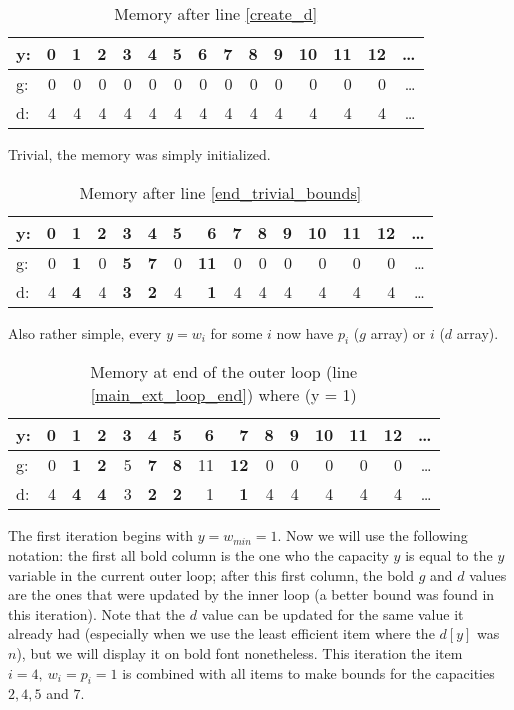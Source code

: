 \documentclass[12pt]{article}
\begin{document}
\begin{table}[h]
\centering
\caption{Memory after line \ref{create_d}}
\label{mem_after_creation}
\begin{tabular}{l|rrrrrrrrrrrrrr}
y: & 0 &1 &2 &3 &4 &5 &6 &7 &8 &9 &10 &11 &12 &\dots\\
\hline
g: & 0 &0 &0 &0 &0 &0 &0 &0 &0 &0 &0 &0 &0 &\dots\\
d: & 4 & 4 & 4 & 4 & 4 & 4 & 4 & 4 & 4 & 4 & 4 & 4 & 4 & \dots\\
\end{tabular}
\end{table}

Trivial, the memory was simply initialized.

\begin{table}[h]
\centering
\caption{Memory after line \ref{end_trivial_bounds}}
\label{mem_after_trivial_bounds}
\begin{tabular}{l|rrrrrrrrrrrrrr}
y: & 0 &\textbf{1} &2 &\textbf{3} &\textbf{4} &5 &\textbf{6} &7 &8 &9 &10 &11 &12 &\dots\\
\hline
g: & 0 & \textbf{1} &0 &\textbf{5} &\textbf{7} &0 &\textbf{11} &0 &0 &0 &0 &0 &0 &\dots\\
d: & 4 & \textbf{4} & 4 & \textbf{3} & \textbf{2} & 4 & \textbf{1} & 4 & 4 & 4 & 4 & 4 & 4 & \dots\\
\end{tabular}
\end{table}

Also rather simple, every \(y = w_i\) for some \(i\) now have \(p_i\) (\(g\) array) or \(i\) (\(d\) array).

\begin{table}[H]
\centering
\caption{Memory at end of the outer loop (line \ref{main_ext_loop_end}) where (y = 1)}
\label{mem_y_1}
\begin{tabular}{l|rrrrrrrrrrrrrr}
y: & 0 & \textbf{1} &2 &3 &4 &5 &6 &7 &8 &9 &10 &11 &12 &\dots\\
\hline
g: & 0 & \textbf{1} &\textbf{2} &5 &\textbf{7} &\textbf{8} &11 &\textbf{12} &0 &0 &0 &0 &0 &\dots\\
d: & 4 & \textbf{4} & \textbf{4} & 3 & \textbf{2} & \textbf{2} & 1 & \textbf{1} & 4 & 4 & 4 & 4 & 4 & \dots\\
\end{tabular}
\end{table}

The first iteration begins with \(y = w_{min} = 1\). Now we will use the following notation: the first all bold column is the one who the capacity \(y\) is equal to the \(y\) variable in the current outer loop; after this first column, the bold \(g\) and \(d\) values are the ones that were updated by the inner loop (a better bound was found in this iteration). Note that the \(d\) value can be updated for the same value it already had (especially when we use the least efficient item where the \(d[y]\) was \(n\)), but we will display it on bold font nonetheless. This iteration the item \(i = 4,~w_i = p_i = 1\) is combined with all items to make bounds for the capacities \(2, 4, 5\) and \(7\).
\end{document}
